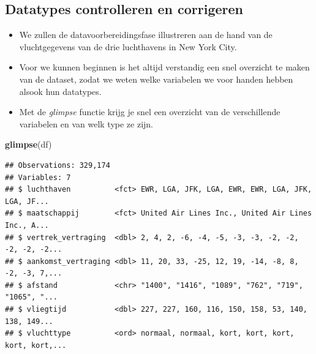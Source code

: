 \documentclass[]{tufte-book}
\newenvironment{Shaded}{}{}
\newcommand{\KeywordTok}[1]{\textcolor[rgb]{0.00,0.44,0.13}{\textbf{#1}}}
\newcommand{\NormalTok}[1]{#1}
\providecommand{\tightlist}{%
  \setlength{\itemsep}{0pt}\setlength{\parskip}{0pt}}
\begin{document}
\hypertarget{datatypes-controlleren-en-corrigeren}{%
\subsection{Datatypes controlleren en corrigeren}\label{datatypes-controlleren-en-corrigeren}}

\begin{itemize}
\tightlist
\item
  We zullen de datavoorbereidingsfase illustreren aan de hand van de vluchtgegevens van de drie luchthavens in New York City.
\item
  Voor we kunnen beginnen is het altijd verstandig een snel overzicht te maken van de dataset, zodat we weten welke variabelen we voor handen hebben alsook hun datatypes.
\item
  Met de \emph{glimpse} functie krijg je snel een overzicht van de verschillende variabelen en van welk type ze zijn.
\end{itemize}

\begin{Shaded}
\begin{Highlighting}[]
\KeywordTok{glimpse}\NormalTok{(df)}
\end{Highlighting}
\end{Shaded}

\begin{verbatim}
## Observations: 329,174
## Variables: 7
## $ luchthaven          <fct> EWR, LGA, JFK, LGA, EWR, EWR, LGA, JFK, LGA, JF...
## $ maatschappij        <fct> United Air Lines Inc., United Air Lines Inc., A...
## $ vertrek_vertraging  <dbl> 2, 4, 2, -6, -4, -5, -3, -3, -2, -2, -2, -2, -2...
## $ aankomst_vertraging <dbl> 11, 20, 33, -25, 12, 19, -14, -8, 8, -2, -3, 7,...
## $ afstand             <chr> "1400", "1416", "1089", "762", "719", "1065", "...
## $ vliegtijd           <dbl> 227, 227, 160, 116, 150, 158, 53, 140, 138, 149...
## $ vluchttype          <ord> normaal, normaal, kort, kort, kort, kort, kort,...
\end{verbatim}
\end{document}
